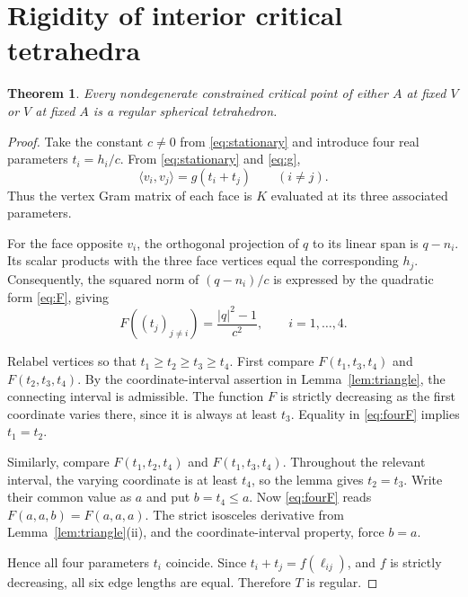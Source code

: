 \documentclass[11pt,reqno]{amsart}
\newtheorem{theorem}{Theorem}[section]
\theoremstyle{remark}
\newcommand{\ip}[2]{\langle #1,#2\rangle}
\begin{document}
\section{Rigidity of interior critical tetrahedra}\label{sec:critical}

\begin{theorem}\label{thm:critical}
Every nondegenerate constrained critical point of either $A$ at fixed $V$ or $V$ at fixed $A$ is a regular spherical tetrahedron.
\end{theorem}
\begin{proof}
Take the constant $c\ne0$ from \eqref{eq:stationary} and introduce four real parameters $t_i=h_i/c$. From \eqref{eq:stationary} and \eqref{eq:g},
\begin{equation}\label{eq:vertex-gram}
 \ip{v_i}{v_j}=g(t_i+t_j)\qquad(i\ne j).
\end{equation}
Thus the vertex Gram matrix of each face is $K$ evaluated at its three associated parameters.

For the face opposite $v_i$, the orthogonal projection of $q$ to its linear span is $q-n_i$. Its scalar products with the three face vertices equal the corresponding $h_j$. Consequently, the squared norm of $(q-n_i)/c$ is expressed by the quadratic form \eqref{eq:F}, giving
\begin{equation}\label{eq:fourF}
 F((t_j)_{j\ne i})=\frac{|q|^2-1}{c^2},
 \qquad i=1,\ldots,4.
\end{equation}

Relabel vertices so that $t_1\ge t_2\ge t_3\ge t_4$. First compare $F(t_1,t_3,t_4)$ and $F(t_2,t_3,t_4)$. By the coordinate-interval assertion in Lemma~\ref{lem:triangle}, the connecting interval is admissible. The function $F$ is strictly decreasing as the first coordinate varies there, since it is always at least $t_3$. Equality in \eqref{eq:fourF} implies $t_1=t_2$.

Similarly, compare $F(t_1,t_2,t_4)$ and $F(t_1,t_3,t_4)$. Throughout the relevant interval, the varying coordinate is at least $t_4$, so the lemma gives $t_2=t_3$. Write their common value as $a$ and put $b=t_4\le a$. Now \eqref{eq:fourF} reads $F(a,a,b)=F(a,a,a)$. The strict isosceles derivative from Lemma~\ref{lem:triangle}(ii), and the coordinate-interval property, force $b=a$.

Hence all four parameters $t_i$ coincide. Since $t_i+t_j=f(\ell_{ij})$, and $f$ is strictly decreasing, all six edge lengths are equal. Therefore $T$ is regular.
\end{proof}
\end{document}
